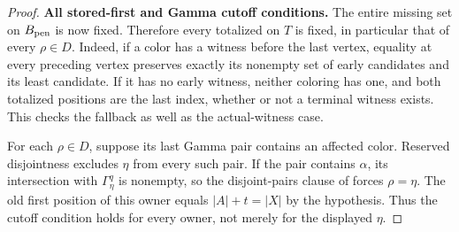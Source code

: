 \begin{proof}
\textbf{All stored-first and Gamma cutoff conditions.}
The entire missing set on $B_{\rm pen}$ is now fixed. Therefore every
totalized  on $T$ is fixed,
in particular that of every $\rho\in D$. Indeed, if a color has a
witness before the last vertex, equality at every preceding vertex
preserves exactly its nonempty set of early candidates and its least
candidate. If it has no early witness, neither coloring has one,
and both totalized positions are the last index, whether or not a
terminal witness exists. This checks the fallback as well as the
actual-witness case.

For each $\rho\in D$, suppose its last Gamma pair contains an
affected color. Reserved disjointness excludes $\eta$ from every such
pair. If the pair contains $\alpha$, its intersection with
$\Gamma^q_\eta$ is nonempty, so the disjoint-pairs clause of
 forces $\rho=\eta$.
The old first position of this owner equals $|A|+t=|X|$ by the
hypothesis. Thus the cutoff condition holds for every owner, not merely
for the displayed $\eta$.


\end{proof}
